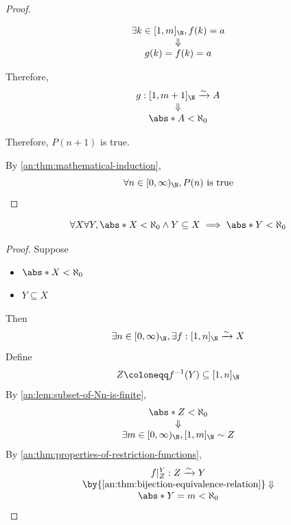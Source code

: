 \begin{proof}
\begin{itemize}
\begin{itemize}
\begin{itemize}
\begin{itemize}
\[\begin{array}{c}
                                      \exists k \in [1, m]_{\N}, f(k) = a                              \\
                                      \Downarrow                                                       \\
                                      g(k) = f(k) = a
                                    \end{array}
                                  \]
                          \end{itemize}
                  \end{itemize}
                  Therefore,
                  \[
                    \begin{array}{c}
                      g: [1, m + 1]_{\N} \xrightarrow{\sim} A \\
                      \Downarrow                              \\
                      \abs*{A} < \aleph_{0}                   \\
                    \end{array}
                  \]
          \end{itemize}
          Therefore, $P(n + 1)$ is true.
  \end{itemize}
  By \cref{an:thm:mathematical-induction},
  \[
    \forall n \in [0, \infty)_{\N}, P(n) \text{ is true}
  \]
\end{proof}

\bigskip

\begin{theorem} \label{an:thm:subset-of-finite-set-is-finite}
  \[
    \forall X \forall Y, \abs*{X} < \aleph_{0} \land Y \subseteq X \implies \abs*{Y} < \aleph_{0}
  \]
\end{theorem}

\begin{proof}
  Suppose
  \begin{itemize}
    \item $\abs*{X} < \aleph_{0}$
    \item $Y \subseteq X$
  \end{itemize}
  Then
  \[
    \exists n \in [0, \infty)_{\N}, \exists f: [1, n]_{\N} \xrightarrow{\sim} X
  \]
  Define
  \[
    Z \coloneqq f^{-1}(Y) \subseteq [1, n]_{\N}
  \]
  By \cref{an:lem:subset-of-Nn-is-finite},
  \[
    \begin{array}{c}
      \abs*{Z} < \aleph_{0} \\
      \Downarrow            \\
      \exists m \in [0, \infty)_{\N}, [1, m]_{\N} \sim Z
    \end{array}
  \]
  By \cref{an:thm:properties-of-restriction-functions},
  \[
    \begin{array}{c}
      f|_{Z}^{Y}: Z \xrightarrow{\sim} Y                           \\
      \by{\Cref{an:thm:bijection-equivalence-relation}} \Downarrow \\
      \abs*{Y} = m < \aleph_{0}
    \end{array}
  \]
\end{proof}
